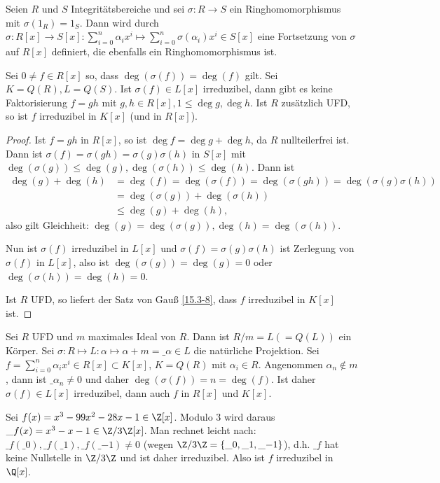 \begin{st}[Reduktionskriterium] \label{15.3-12}
	Seien $R$ und $S$ Integritätsbereiche und sei $\sigma: R \to S$ ein Ringhomomorphismus mit $\sigma(1_R) = 1_S$.
	Dann wird durch $\sigma: R[x] \to S[x] : \sum_{i=0}^n \alpha_i x^i \mapsto \sum_{i=0}^n \sigma(\alpha_i) x^i \in S[x]$ eine Fortsetzung von $\sigma$ auf $R[x]$ definiert, die ebenfalls ein Ringhomomorphismus ist.

	Sei $0 \neq f \in R[x]$ so, dass $\deg(\sigma(f)) = \deg(f)$ gilt.
	Sei $K = Q(R), L = Q(S)$.
	Ist $\sigma(f) \in L[x]$ irreduzibel, dann gibt es keine Faktorisierung $f = gh$ mit $g, h \in R[x], 1 \le \deg g, \deg h$.
	Ist $R$ zusätzlich UFD, so ist $f$ irreduzibel in $K[x]$ (und in $R[x]$).
	\begin{proof}
		Ist $f = gh$ in $R[x]$, so ist $\deg f = \deg g + \deg h$, da $R$ nullteilerfrei ist.
		Dann ist $\sigma(f) = \sigma(gh) = \sigma(g)\sigma(h)$ in $S[x]$ mit $\deg(\sigma(g)) \le \deg(g), \deg(\sigma(h)) \le \deg(h)$.
		Dann ist
		\begin{align*}
			\deg(g) + \deg(h)
			&= \deg(f)
			= \deg(\sigma(f))
			= \deg(\sigma(gh))
			= \deg(\sigma(g)\sigma(h)) \\
			&= \deg(\sigma(g)) + \deg(\sigma(h)) \\
			&\le \deg(g) + \deg(h),
		\end{align*}
		also gilt Gleichheit: $\deg(g) = \deg(\sigma(g)), \deg(h) = \deg(\sigma(h))$.

		Nun ist $\sigma(f)$ irreduzibel in $L[x]$ und $\sigma(f) = \sigma(g)\sigma(h)$ ist Zerlegung von $\sigma(f)$ in $L[x]$, also ist $\deg(\sigma(g)) = \deg(g) = 0$ oder $\deg(\sigma(h)) = \deg(h) = 0$.

		Ist $R$ UFD, so liefert der Satz von Gauß \ref{15.3-8}, dass $f$ irreduzibel in $K[x]$ ist.
	\end{proof}
\end{st}

\begin{ex} \label{15.3-13}
	Sei $R$ UFD und $m$ maximales Ideal von $R$.
	Dann ist $R / m = L (= Q(L))$ ein Körper.
	Sei $\sigma: R \mapsto L: \alpha \mapsto \alpha + m = \_\alpha \in L$ die natürliche Projektion.
	Sei $f = \sum_{i=0}^n \alpha_i x^i \in R[x] \subset K[x]$, $K = Q(R)$ mit $\alpha_i \in R$.
	Angenommen $\alpha_n \not\in m$, dann ist $\_{\alpha_n} \neq 0$ und daher $\deg(\sigma(f)) = n = \deg(f)$.
	Ist daher $\sigma(f) \in L[x]$ irreduzibel, dann auch $f$ in $R[x]$ und $K[x]$.
	\begin{ex*}
		Sei $f(x) = x^3 - 99x^2 - 28x - 1 \in \Z[x]$.
		Modulo 3 wird daraus $\_f(x) = x^3 - x - 1 \in \Z / 3\Z[x]$.
		Man rechnet leicht nach: $\_f(\_0), \_f(\_1), \_f(\_{-1}) \neq 0$ (wegen $\Z / 3\Z = \{\_0, \_1, \_{-1}\}$), d.h. $\_f$ hat keine Nullstelle in $\Z / 3\Z$ und ist daher irreduzibel.
		Also ist $f$ irreduzibel in $\Q[x]$.
	\end{ex*}
\end{ex}

